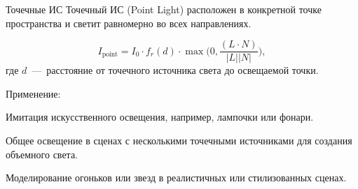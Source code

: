 \documentclass{beamer}
\begin{document}
	\begin{frame}{Точечные ИС}
		Точечный ИС (Point Light)
		расположен в конкретной точке пространства и светит равномерно во всех направлениях.

		\[
			I_{\text{point}} = I_0 \cdot f_r(d) \cdot 
			\max \bigg( 0, \frac{(L \cdot N)}{\lvert L \rvert \lvert N \rvert} \bigg)
			,
		\]
		где $d$~---~расстояние от точечного источника света до освещаемой точки.

		Применение:

		Имитация искусственного освещения, например, лампочки или фонари. 
		
		Общее освещение в сценах с несколькими точечными источниками для создания объемного света.

		Моделирование огоньков или звезд в реалистичных или стилизованных сценах.

	\end{frame}
\end{document}
